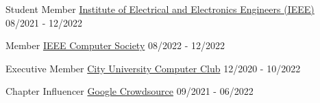
\begin{cvhonors}

\cvhonor
    {Student Member} %
    {\href{https://www.ieee.org/}{Institute of Electrical and Electronics Engineers (IEEE)}} %
    {} %
    {08/2021 - 12/2022} %

\cvhonor
    {Member} %
    {\href{https://www.computer.org/}{IEEE Computer Society}} %
    {} %
    {08/2022 - 12/2022} %

\cvhonor
    {Executive Member} %
    {\href{https://cityuniversity.ac.bd/}{City University Computer Club}} %
    {} %
    {12/2020 - 10/2022} %

\cvhonor
    {Chapter Influencer} %
    {\href{https://crowdsource.google.com/about/}{Google Crowdsource}} %
    {} %
    {09/2021 - 06/2022} %

\end{cvhonors}
